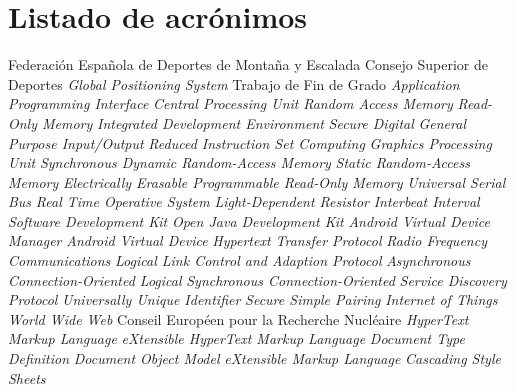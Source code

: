 \chapter{Listado de acrónimos}

{\small
\begin{acronym}[XXXXXXXX]
       {Federación Española de Deportes de Montaña y Escalada}
         {Consejo Superior de Deportes}
         {\textit{Global Positioning System}}
  	   {Trabajo de Fin de Grado}
  	   {\textit{Application Programming Interface}}
  	   {\textit{Central Processing Unit}}
  	   {\textit{Random Access Memory}}
  	   {\textit{Read-Only Memory}}
  	   {\textit{Integrated Development Environment}}
  		   {\textit{Secure Digital}}
        {\textit{General Purpose Input/Output}}
  	   {\textit{Reduced Instruction Set Computing}}
  	   {\textit{Graphics Processing Unit}}
  	   {\textit{Synchronous Dynamic Random-Access Memory}}
        {\textit{Static Random-Access Memory}}
      {\textit{Electrically Erasable Programmable Read-Only Memory}}
  	   {\textit{Universal Serial Bus}}
  	   {\textit{Real Time Operative System}}
  	   {\textit{Light-Dependent Resistor}}	
  	   {\textit{Interbeat Interval}}	
  	   {\textit{Software Development Kit}}
     {\textit{Open Java Development Kit}}	
  	   {\textit{Android Virtual Device Manager}}
  	   {\textit{Android Virtual Device}}		
        {\textit{Hypertext Transfer Protocol}}
      {\textit{Radio Frequency Communications}}
  	   {\textit{Logical Link Control and Adaption Protocol}}
         {\textit{Asynchronous Connection-Oriented Logical}}	 	
         {\textit{Synchronous Connection-Oriented}}
         {\textit{Service Discovery Protocol}}
  	   {\textit{Universally Unique Identifier}}	
  	   {\textit{Secure Simple Pairing}}
  	   {\textit{Internet of Things}}
  	   {\textit{World Wide Web}}
  	   {Conseil Européen pour la Recherche Nucléaire}
  	   {\textit{HyperText Markup Language}}
  	   {\textit{eXtensible HyperText Markup Language}}
  	   {\textit{Document Type Definition}}
  	   {\textit{Document Object Model}}	
  	   {\textit{eXtensible Markup Language}}
  	   {\textit{Cascading Style Sheets}}

\end{acronym}}
